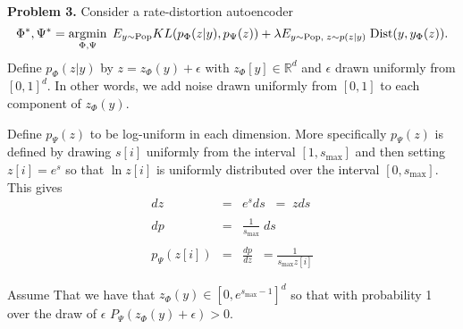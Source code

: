 \documentclass{article}
\newcommand{\solution}[1]{}
\begin{document}
\solution{
  
\begin{eqnarray*}
 & & I_\Phi(y,z) \\
 \\
 & = & E_{y \sim \pop}\; KL(p_\Phi(z|y),p_\Phi(z)) \\
\\
& = & E_{y,z\sim P_\Phi(z|y)}\; \left(\ln \frac{p_\Phi(z|y)}{{\color{red} q(z)}} + \ln \frac{{\color{red} q(z)}}{p_\Phi(z)}\right) \\
\\
& = & E_{y \sim \pop}\;KL(p_\Phi(z|y),q(z)) + \left(E_{y \sim \pop,\;z\sim p_\Phi(z|y)}\;\ln \frac{q(z)}{p_\Phi(z)}\right)
\\
& = & E_y\;KL(p_\Phi(z|y),q(z)) + E_{\color{red} z\sim p_\Phi(z)}\;\ln \frac{q(z)}{p_\Phi(z)} \\
\\
& = & E_y\;KL(p_\Phi(z|y),q(z)) - KL(p_\Phi(z),q(z)) \\
\\
& \leq & E_{y \sim \pop}\; KL(p_\Phi(z|y),q(z))
\end{eqnarray*}

From part (a) equality is achieved when $q(z) = p_\Phi(z)$.
}

\bigskip
{\bf Problem 3.}
Consider a rate-distortion autoencoder
$$\Phi^*,\Psi^*  = \operatorname*{argmin}_{\Phi,\Psi}\;E_{y \sim \mathrm{Pop}} KL(p_\Phi(z|y),p_\Psi(z)) + \lambda E_{y \sim \mathrm{Pop},\;z \sim p(z|y)}\;\mathrm{Dist}(y,y_\Phi(z)).$$
Define $p_\Phi(z|y)$ by $z = z_\Phi(y) + \epsilon$ with $z_\Phi[y] \in \mathbb{R}^d$
and $\epsilon$ drawn uniformly from $[0,1]^d$. In other words,
we add noise drawn uniformly from $[0,1]$ to each component of $z_\Phi(y)$.

\medskip
Define $p_\Psi(z)$ to be log-uniform in each dimension.  More specifically
$p_\Psi(z)$ is defined by drawing $s[i]$ uniformly from the interval
$[1,s_{\mathrm{max}}]$ and then setting $z[i] = e^s$ so that $\ln z[i]$ is uniformly distributed over the interval $[0,s_{\mathrm{max}}]$.
This gives
\begin{eqnarray*}
  dz & = & e^sds  \;\;= \;zds\\
  \\
  dp & = & \frac{1}{s_{\mathrm{max}}}\;ds \\
  \\
  p_\Psi(z[i]) & = & \frac{dp}{dz} \;\;= \frac{1}{s_{\mathrm{max}}z[i]}
\end{eqnarray*}

\medskip
Assume That we have that $z_\Phi(y) \in [0,e^{s_{\mathrm{max}} - 1}]^d$ so that with probability 1 over the draw of $\epsilon$
$P_\Psi(z_\Phi(y) + \epsilon) > 0$.
\end{document}
